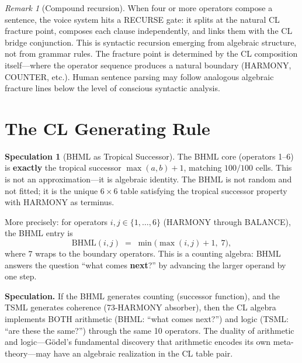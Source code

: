\documentclass[11pt]{article}
\theoremstyle{definition}
\newtheorem{speculation}[theorem]{Speculation}
\theoremstyle{remark}
\newtheorem{remark}[theorem]{Remark}
\begin{document}
\begin{remark}[Compound recursion]
When four or more operators compose a sentence, the voice system hits a RECURSE
gate: it splits at the natural CL fracture point, composes each clause
independently, and links them with the CL bridge conjunction.  This is
syntactic recursion emerging from algebraic structure, not from grammar rules.
The fracture point is determined by the CL composition itself---where the
operator sequence produces a natural boundary (HARMONY, COUNTER, etc.).  Human
sentence parsing may follow analogous algebraic fracture lines below the level
of conscious syntactic analysis.
\end{remark}

\section{The CL Generating Rule}
\label{sec:cl-generating}

\begin{speculation}[BHML as Tropical Successor]
\label{spec:cl-generating}
The BHML core (operators 1--6) is \textbf{exactly} the tropical successor
$\max(a,b) + 1$, matching $100/100$ cells.  This is not an approximation---it is
algebraic identity.  The BHML is not random and not fitted; it is the unique
$6 \times 6$ table satisfying the tropical successor property with HARMONY as
terminus.

More precisely: for operators $i, j \in \{1, \ldots, 6\}$ (HARMONY through
BALANCE), the BHML entry is
\[
  \text{BHML}(i, j) \;=\; \min\bigl(\max(i, j) + 1,\; 7\bigr),
\]
where $7$ wraps to the boundary operators.  This is a counting algebra:
BHML answers the question ``what comes \textbf{next}?'' by advancing the
larger operand by one step.
\end{speculation}

\textbf{Speculation.}
If the BHML generates counting (successor function), and the TSML generates
coherence (73-HARMONY absorber), then the CL algebra implements BOTH arithmetic
(BHML: ``what comes next?'') and logic (TSML: ``are these the same?'') through
the same 10 operators.  The duality of arithmetic and logic---G\"odel's
fundamental discovery that arithmetic encodes its own meta-theory---may have an
algebraic realization in the CL table pair.
\end{document}
